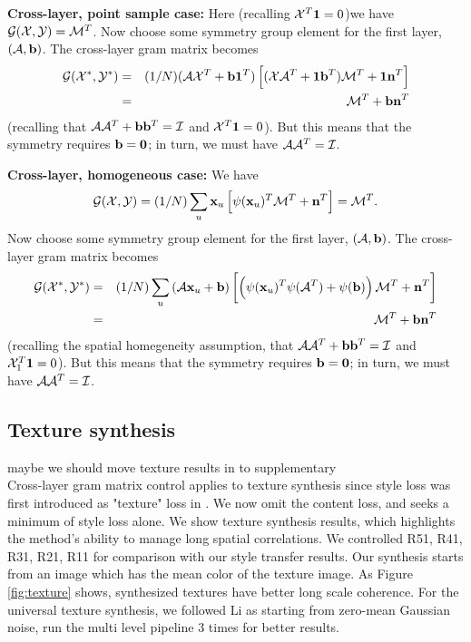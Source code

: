 \documentclass[runningheads]{llncs}
\newcommand{\vect}[1]{{\bf {#1}}}
\newcommand{\matx}[1]{{\cal {#1}}}
\begin{document}
{\bf Cross-layer, point sample case:} Here (recalling $\matx{X}^T\vect{1}=0$)we have ${\cal G}(\matx{X},
\matx{Y})=\matx{M}^T$.    Now choose some symmetry group element for the first layer,
$\left(\matx{A}, \vect{b}\right)$.  The cross-layer gram matrix
becomes 
\begin{eqnarray*}
{\cal G}(\matx{X}^*, \matx{Y}^*)&=&(1/N) (\matx{A}
\matx{X}^T+\vect{b}\vect{1}^T)
\left[(\matx{X}
  \matx{A}^T+\vect{1}\vect{b}^T)\matx{M}^T+\vect{1}\vect{n}^T\right]\\
&=&\matx{M}^T+\vect{b}\vect{n}^T
\end{eqnarray*}
(recalling that $\matx{A}\matx{A}^T+\vect{b}\vect{b}^T=\matx{I}$ and
$\matx{X}^T\vect{1}=0$).  But this means that the symmetry requires
$\vect{b}=\vect{0}$; in turn, we must have $\matx{A}\matx{A}^T=\matx{I}$.


{\bf Cross-layer, homogeneous case:} We have
\[
{\cal G}(\matx{X}, \matx{Y})=(1/N)\sum_u \vect{x}_u\left[
  \psi(\vect{x}_u)^T\matx{M}^T+\vect{n}^T\right]=\matx{M}^T.\]
Now choose some symmetry group element for the first layer,
$\left(\matx{A}, \vect{b}\right)$.  The cross-layer gram matrix
becomes 
\begin{eqnarray*}
{\cal G}(\matx{X}^*, \matx{Y}^*)&=&(1/N)\sum_u \left(\matx{A} \vect{x}_u+\vect{b}\right)\left[\left(\psi(\vect{x}_u)^T\psi(\matx{A}^T)+\psi(\vect{b})\right)\matx{M}^T+\vect{n}^T\right]\\
&=&\matx{M}^T+\vect{b}\vect{n}^T
\end{eqnarray*}
(recalling the spatial homegeneity assumption, that $\matx{A}\matx{A}^T+\vect{b}\vect{b}^T=\matx{I}$ and
$\matx{X}_1^T\vect{1}=0$).  But this means that the symmetry requires
$\vect{b}=\vect{0}$; in turn, we must have
$\matx{A}\matx{A}^T=\matx{I}$.


\subsection{Texture synthesis} 
\todo maybe we should move texture results in to supplementary\\

Cross-layer gram matrix control applies to texture synthesis since style loss \cite{gatys2016image} was first introduced as "texture" loss in \cite{NIPS2015_5633}.  We now omit the content loss, and seeks a minimum of style loss alone.  We show texture synthesis results, which highlights the method's ability to manage long spatial correlations.  We controlled R51, R41, R31, R21, R11 for comparison with our style transfer results.  Our synthesis starts from an image which has the mean color of the texture image. 
As Figure \ref{fig:texture} shows, synthesized textures have better long scale coherence.    For the universal texture synthesis, we followed Li \ea  as starting from zero-mean Gaussian noise, run the multi level pipeline 3 times for better results.
\end{document}
